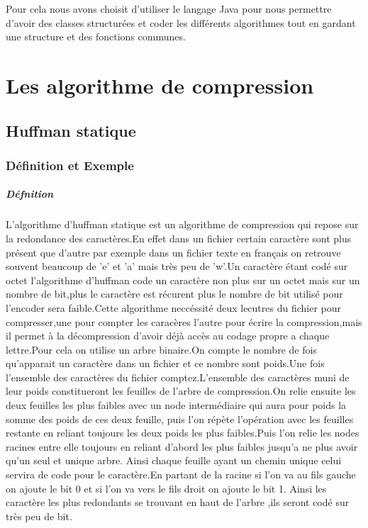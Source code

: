 \documentclass{report}
\begin{document}
Pour cela nous avons choisit d'utiliser le langage Java pour nous permettre d'avoir des classes structurées et coder les différents algorithmes tout en gardant une structure et des fonctions communes.
 
\part{Les algorithme de compression}
\chapter*{Huffman statique}
\section*{Définition et Exemple }
\subsubsection*{Défnition}
L'algorithme d'huffman statique est un algorithme de compression qui repose sur la redondance des caractères.En effet dans un fichier certain caractère sont plus présent que d'autre par exemple dans un fichier texte en français on retrouve souvent beaucoup de 'e' et 'a' mais très peu de 'w'.Un caractère étant codé sur octet l'algorithme d'huffman code un caractère non plus sur un octet mais sur un nombre de bit,plus le caractère est récurent plus le nombre de bit utilisé pour l'encoder sera faible.Cette algorithme neccéssité deux lecutres du fichier pour compresser,une pour compter les caracères l'autre pour écrire la compression,mais il permet à la décompression d'avoir déjà accès au codage propre a chaque lettre.Pour cela on utilise un arbre binaire.On compte le nombre de fois qu'apparait un caractère dans un fichier et ce nombre  sont poids.Une fois l'ensemble des caractères du fichier comptez.L'ensemble des caractères muni de leur poids constitueront les feuilles de  l'arbre de compression.On relie ensuite les deux feuilles les plus faibles avec un node intermédiaire qui aura pour poids  la somme des poids de ces deux feuille, puis l'on répète l'opération avec les feuilles restante en reliant toujours les deux poids les plus faibles.Puis l'on relie les nodes racines entre elle toujours en reliant d'abord les plus faibles jusqu'a ne plus avoir qu'un seul et unique arbre. Ainsi chaque feuille ayant un chemin unique celui servira de code pour le caractère.En partant de la racine si l'on va au fils gauche on ajoute le bit 0 et si l'on va vers le fils droit on ajoute le bit 1. Ainsi les caractère les plus redondants se trouvant en haut de l'arbre ,ils seront codé sur très peu de bit.
\end{document}
